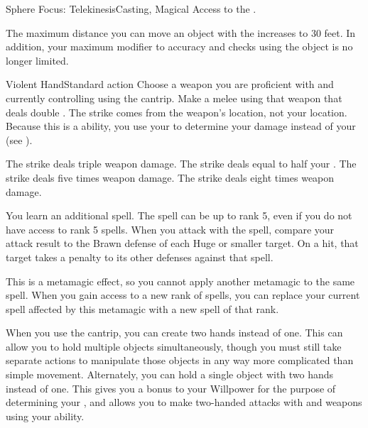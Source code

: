   \begin{magicalfeat}{Sphere Focus: Telekinesis}{Casting, Magical}
    \featpre Access to the  .

     The maximum distance you can move an object with the   increases to 30 feet.
    In addition, your maximum modifier to accuracy and checks using the object is no longer limited.

    \begin{magicalactiveability}{Violent Hand}{Standard action}
      \rankline
      Choose a weapon you are proficient with and currently controlling using the  cantrip.
      Make a melee  using that weapon that deals double .
      The strike comes from the weapon's location, not your location.
      Because this is a \magical ability, you use your  to determine your damage instead of your  (see ).

      \rankline
       The strike deals triple weapon damage.
       The strike deals  equal to half your .
       The strike deals five times weapon damage.
       The strike deals eight times weapon damage.
    \end{magicalactiveability}

     You learn an additional spell.
    The spell can be up to rank 5, even if you do not have access to rank 5 spells.
    When you attack with the spell, compare your attack result to the Brawn defense of each Huge or smaller target.
    On a hit, that target takes a  penalty to its other defenses against that spell.

    This is a metamagic effect, so you cannot apply another metamagic to the same spell.
    When you gain access to a new rank of spells, you can replace your current spell affected by this metamagic with a new spell of that rank.

     When you use the  cantrip, you can create two hands instead of one.
    This can allow you to hold multiple objects simultaneously, though you must still take separate actions to manipulate those objects in any way more complicated than simple movement.
    Alternately, you can hold a single object with two hands instead of one.
    This gives you a  bonus to your Willpower for the purpose of determining your , and allows you to make two-handed attacks with  and  weapons using your  ability.
  \end{magicalfeat}

